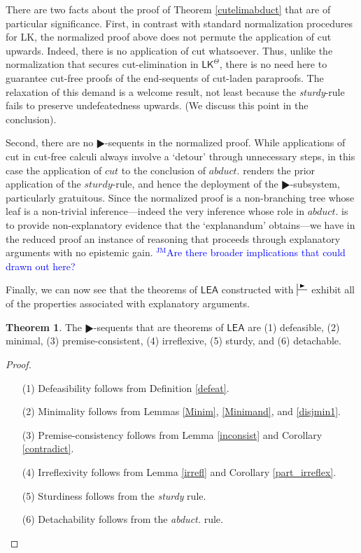 \documentclass{article}
\theoremstyle{definition}
\newtheorem{theorem}{Theorem}
\theoremstyle{definition}
\theoremstyle{definition}
\theoremstyle{definition}
\theoremstyle{remark}
\theoremstyle{definition}
\theoremstyle{definition}
\newcommand{\jm}[1]{\textcolor{blue}{$^{\textrm{JM}}${#1}}}
\begin{document}
There are two facts about the proof of Theorem \ref{cutelimabduct} that are of particular significance. First, in contrast with standard normalization procedures for \textsf{LK}, the normalized proof above does not permute the application of cut upwards. Indeed, there is no application of cut whatsoever. Thus, unlike the normalization that secures cut-elimination in $ \mathsf{LK^\Theta}$, there is no need here to guarantee cut-free proofs of the end-sequents of cut-laden paraproofs. The relaxation of this demand is a welcome result, not least because the \textit{sturdy}-rule fails to preserve undefeatedness upwards. (We discuss this point in the conclusion). 

Second, there are no $ \RHD$-sequents in the normalized proof. While applications of cut in cut-free calculi always involve a `detour' through unnecessary steps, in this case the application of $ cut $ to the conclusion of $ abduct. $ renders the prior application of the $ sturdy $-rule, and hence the deployment of the $ \RHD$-subsystem, particularly gratuitous. Since the normalized proof is a non-branching tree whose leaf is a non-trivial inference---indeed the very inference whose role in $ abduct. $ is to provide non-explanatory evidence that the `explanandum' obtains---we have in the reduced proof an instance of reasoning that proceeds through explanatory arguments with no epistemic gain. \jm{Are there broader implications that could drawn out here?}

Finally, we can now see that the theorems of $ \mathsf{LEA}$ constructed with $ \sststile{}{\RHD} $ exhibit all of the properties associated with explanatory arguments.

\begin{theorem}\label{properties}
	The $ \RHD$-sequents that are theorems of $ \mathsf{LEA} $ are (1) defeasible, (2) minimal, (3) premise-consistent, (4) irreflexive, (5) sturdy, and (6) detachable.
	
	\begin{proof}
		\begin{itemize}
			\item[(1)] Defeasibility follows from Definition \ref{defeat}.
			\item[(2)] Minimality follows from Lemmas \ref{Minim}, \ref{Minimand}, and \ref{disjmin1}.
			\item[(3)] Premise-consistency follows from Lemma \ref{inconsist} and Corollary \ref{contradict}.
			\item[(4)] Irreflexivity follows from Lemma \ref{irrefl} and Corollary \ref{part_irreflex}.
			\item[(5)] Sturdiness follows from the \textit{sturdy} rule.
			\item[(6)] Detachability follows from the \textit{abduct.} rule.
		\end{itemize}
	\end{proof}
	
	
\end{theorem}
\end{document}
